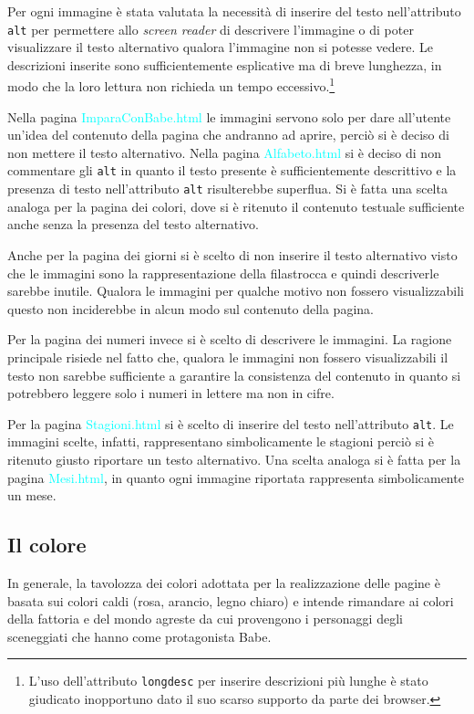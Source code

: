 \documentclass[10pt,a4paper,onecolumn]{article}
\newcommand{\sitepage}[1]{\textcolor{cyan}{\textsf{#1}}}
\newcommand{\inglese}[1]{\foreignlanguage{english}{\itshape{}#1}}
\begin{document}
Per ogni immagine è stata valutata la necessità di inserire del testo nell'attributo \texttt{alt} per permettere allo \inglese{screen reader} di descrivere l'immagine o di poter visualizzare il testo alternativo qualora l'immagine non si potesse vedere. Le descrizioni inserite sono sufficientemente esplicative ma di breve lunghezza, in modo che la loro lettura non richieda un tempo eccessivo.\footnote{%
    L'uso dell'attributo \texttt{longdesc} per inserire descrizioni più lunghe è stato giudicato inopportuno dato il suo scarso supporto da parte dei browser.
}

Nella pagina \sitepage{ImparaConBabe.html} le immagini servono solo per dare all'utente un'idea del contenuto della pagina che andranno ad aprire, perciò si è deciso di non mettere il testo alternativo. 
Nella pagina \sitepage{Alfabeto.html} si è deciso di non commentare gli \texttt{alt} in quanto il testo presente è sufficientemente descrittivo e la presenza di testo nell'attributo \texttt{alt} risulterebbe superflua.
Si è fatta una scelta analoga per la pagina dei colori, dove si è ritenuto il contenuto testuale sufficiente anche senza la presenza del testo alternativo.

Anche per la pagina dei giorni si è scelto di non inserire il testo alternativo visto che le immagini sono la rappresentazione della filastrocca e quindi descriverle sarebbe inutile.
Qualora le immagini per qualche motivo non fossero visualizzabili questo non inciderebbe in alcun modo sul contenuto della pagina.

Per la pagina dei numeri invece si è scelto di descrivere le immagini.
La ragione principale risiede nel fatto che, qualora le immagini non fossero visualizzabili il testo non sarebbe sufficiente a garantire la consistenza del contenuto in quanto si potrebbero leggere solo i numeri in lettere ma non in cifre.

Per la pagina \sitepage{Stagioni.html} si è scelto di inserire del testo nell'attributo \texttt{alt}. Le immagini scelte, infatti,  rappresentano simbolicamente le stagioni perciò si è ritenuto giusto riportare un testo alternativo.
Una scelta analoga si è fatta per la pagina \sitepage{Mesi.html}, in quanto ogni immagine riportata rappresenta simbolicamente un mese.

\subsection{Il colore}
In generale, la tavolozza dei colori adottata per la realizzazione delle pagine è basata sui colori caldi (rosa, arancio, legno chiaro) e intende rimandare ai colori della fattoria e del mondo agreste da cui provengono i personaggi degli sceneggiati che hanno come protagonista Babe.
\end{document}
